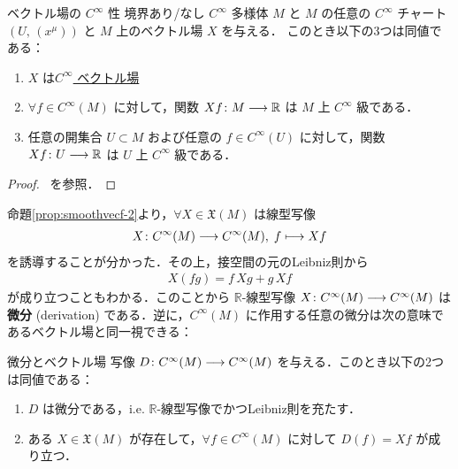 \documentclass[geometry_main]{subfiles}
\begin{document}
\begin{myprop}[label=prop:smoothvecf-2]{ベクトル場の $C^\infty$ 性}
    境界あり/なし $C^\infty$ 多様体 $M$ と $M$ の任意の $C^\infty$ チャート $(U,\, (x^\mu))$ と $M$ 上のベクトル場 $X$ を与える．
    このとき以下の3つは同値である：
    \begin{enumerate}
        \item $X$ は\hyperref[def:vecf]{$C^\infty$ ベクトル場}
        \item $\forall f \in C^\infty (M)$ に対して，関数 $Xf \colon M \longrightarrow \mathbb{R}$ は $M$ 上 $C^\infty$ 級である．
        \item 任意の開集合 $U \subset M$ および任意の $f \in C^\infty (U)$ に対して，関数 $Xf \colon U \longrightarrow \mathbb{R}$ は $U$ 上 $C^\infty$ 級である．
    \end{enumerate}
    
\end{myprop}

\begin{proof}
    ~\cite[p.180, Proposition 8.14]{Lee2012smooth}を参照．
\end{proof}

命題\ref{prop:smoothvecf-2}より，$\forall X \in \mathfrak{X}(M)$ は線型写像
\begin{align}
    X \colon C^\infty (M) \longrightarrow C^\infty(M),\; f \longmapsto Xf
\end{align}
を誘導することが分かった．その上，接空間の元のLeibniz則から
\begin{align}
    X(fg) = f\, Xg + g\, Xf
\end{align}
が成り立つこともわかる．このことから $\mathbb{R}$-線型写像 $X \colon C^\infty (M) \longrightarrow C^\infty(M)$ は\textbf{微分} (derivation) である．逆に，$C^\infty(M)$ に作用する任意の微分は次の意味であるベクトル場と同一視できる：

\begin{myprop}[label=prop:vecf-derivation]{微分とベクトル場}
    写像 $D \colon C^\infty (M) \longrightarrow C^\infty(M)$ を与える．このとき以下の2つは同値である：
    \begin{enumerate}
        \item $D$ は微分である，i.e. $\mathbb{R}$-線型写像でかつLeibniz則を充たす．
        \item ある $X \in \mathfrak{X}(M)$ が存在して，$\forall f \in C^\infty(M)$ に対して $D(f) = Xf$ が成り立つ．
    \end{enumerate}
\end{myprop}
\end{document}

